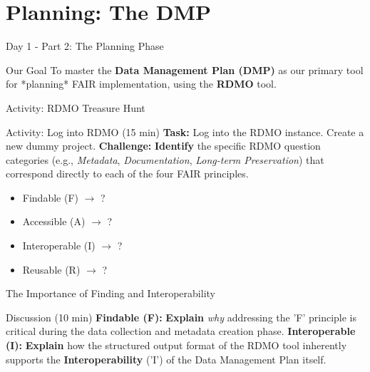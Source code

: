 \documentclass{integrity} %
\begin{document}
\section{Planning: The DMP}

\begin{frame}{Day 1 - Part 2: The Planning Phase}
    \begin{block}{Our Goal}
        To master the \textbf{Data Management Plan (DMP)} as our primary tool for *planning* FAIR implementation, using the \textbf{RDMO} tool.
    \end{block}
\end{frame}

\begin{frame}{Activity: RDMO Treasure Hunt}
    \begin{block}{Activity: Log into RDMO (15 min)}
        \textbf{Task:} Log into the RDMO instance. Create a new dummy project.
        \pause
        \textbf{Challenge:} \textbf{Identify} the specific RDMO question categories (e.g., \emph{Metadata}, \emph{Documentation}, \emph{Long-term Preservation}) that correspond directly to each of the four FAIR principles.
        \begin{itemize}
            \item \pause Findable (F) $\rightarrow$ ?
            \item \pause Accessible (A) $\rightarrow$ ?
            \item \pause Interoperable (I) $\rightarrow$ ?
            \item \pause Reusable (R) $\rightarrow$ ?
        \end{itemize}
    \end{block}
\end{frame}

\begin{frame}{The Importance of Finding and Interoperability}
    \begin{block}{Discussion (10 min)}
        \textbf{Findable (F):} \textbf{Explain} \emph{why} addressing the 'F' principle is critical during the data collection and metadata creation phase.
        \pause
        \textbf{Interoperable (I):} \textbf{Explain} how the structured output format of the RDMO tool inherently supports the \textbf{Interoperability} ('I') of the Data Management Plan itself.
    \end{block}
\end{frame}
\end{document}

